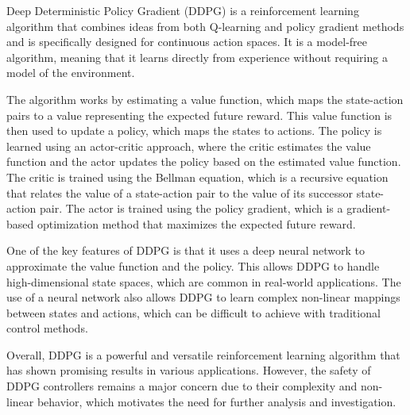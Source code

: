 % 

Deep Deterministic Policy Gradient (DDPG) is a reinforcement learning algorithm that combines ideas 
from both Q-learning and policy gradient methods and is specifically designed for continuous 
action spaces. It is a model-free algorithm, meaning that it learns directly from experience without 
requiring a model of the environment. 

The algorithm works by estimating a value function, which maps the 
state-action pairs to a value representing the expected future reward. This value function is 
then used to update a policy, which maps the states to actions. The policy is learned using an 
actor-critic approach, where the critic estimates the value function and the actor updates the 
policy based on the estimated value function. The critic is trained using the Bellman equation, 
which is a recursive equation that relates the value of a state-action pair to the value of its 
successor state-action pair. The actor is trained using the policy gradient, which is a 
gradient-based optimization method that maximizes the expected future reward.

One of the key features of DDPG is that it uses a deep neural network to approximate the 
value function and the policy. This allows DDPG to handle high-dimensional state spaces, 
which are common in real-world applications. The use of a neural network also allows DDPG 
to learn complex non-linear mappings between states and actions, which can be difficult 
to achieve with traditional control methods.

Overall, DDPG is a powerful and versatile reinforcement learning algorithm that has shown 
promising results in various applications. However, the safety of DDPG controllers remains 
a major concern due to their complexity and non-linear behavior, which motivates the need 
for further analysis and investigation.